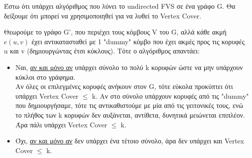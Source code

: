 \documentclass[a4paper,11pt]{article}
\begin{document}
Έστω ότι υπάρχει αλγόριθμος που λύνει το undirected FVS σε ένα γράφο G.
Θα δείξουμε ότι μπορεί να χρησιμοποιηθεί για να λυθεί το Vertex Cover.

Θεωρούμε το γράφο G', που περιέχει τους κόμβους V του G, αλλά κάθε ακμή
$e(u,v)$ έχει αντικατασταθεί με 1 "dummy" κόμβο που έχει ακμές προς τις
κορυφές u και v (δημιουργώντας έτσι κύκλους).
Τότε ο αλγόριθμος απαντάει:
\begin{itemize}
\item Ναι, \underline{αν και μόνο αν} υπάρχει σύνολο το πολύ k κορυφών ώστε να
μην υπάρχουν κύκλοι στο γράφημα.\\ Αν όλες οι επιλεγμένες κορυφές ανήκουν στον
G, τότε εύκολα προκύπτει ότι υπάρχει Vertex Cover $\leq$ k. Αν στο σύνολο
υπάρχουν κορυφές από τις "dummy" που δημιουργήσαμε, τότε τις αντικαθιστούμε με
μία από τις γειτονικές τους, ενώ το πλήθος των k κορυφών δεν αυξάνεται,
αντίθετα, δυνητικά μειώνεται επιπλέον. Άρα πάλι υπάρχει Vertex Cover $\leq$ k.
\item Όχι, \underline{αν και μόνο αν} δεν υπάρχει ένα τέτοιο σύνολο, άρα δεν
υπάρχει και Vertex Cover $\leq$ k.
\end{itemize}

\end{document}
